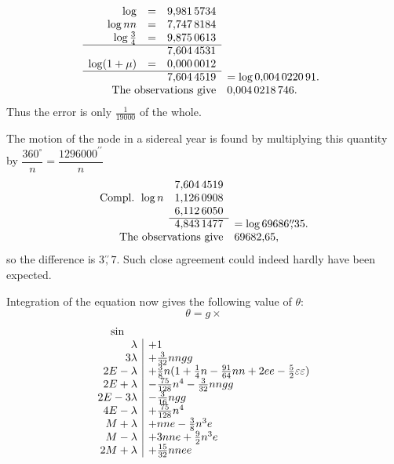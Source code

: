 \begingroup\small
\setlength{\arraycolsep}{2pt}
\renewcommand{\arraystretch}{1.15}
\[
\begin{array}{rcll}
\log&=&9{,}981\,5734&\\
\log nn&=&7{,}747\,8184&\\
\log\tfrac34&=&9{,}875\,0613&\\
\cline{1-3}
&&7{,}604\,4531&\\
\log(1+\mu)&=&0{,}000\,0012&\\
\cline{1-3}
&&7{,}604\,4519&=\log0{,}004\,0220\,91.\\
\multicolumn{3}{r}{\text{The observations give}}&0{,}004\,0218\,746.
\end{array}
\]
\endgroup
\noindent Thus the error is only \(\tfrac1{19000}\) of the whole.
\par\noindent\hspace*{\parindent}The motion of the node in a sidereal year is found by
multiplying this quantity by \(\dfrac{360^\circ}{n}=\dfrac{1296000^{\prime\prime}}{n}\)
\begingroup\small
\setlength{\arraycolsep}{2pt}
\renewcommand{\arraystretch}{1.15}
\[
\begin{array}{rll}
&7{,}604\,4519&\\
\text{Compl. }\log n&1{,}126\,0908&\\
&6{,}112\,6050&\\
\cline{2-2}
&4{,}843\,1477&=\log69686\overset{\prime\prime}{,}35.\\
\multicolumn{2}{r}{\text{The observations give}}&69682{,}65,
\end{array}
\]
\endgroup
\noindent so the difference is \(3\overset{\prime\prime}{,}7\). Such close agreement could indeed
hardly have been expected.
\par\noindent\hspace*{\parindent}Integration of the equation now gives the following value of \(\theta\):
\[
\theta=g\times
\]
\begingroup\small
\setlength{\arraycolsep}{4pt}
\renewcommand{\arraystretch}{1.3}
\[
\begin{array}{r|l}
\multicolumn{1}{c}{\sin}&\\
\lambda&+1\\
3\lambda&+\tfrac3{32}nngg\\
2E-\lambda&+\tfrac38n(1+\tfrac14n-\tfrac{91}{64}nn+2ee-\tfrac52\varepsilon\varepsilon)\\
2E+\lambda&-\tfrac{75}{128}n^4-\tfrac3{32}nngg\\
2E-3\lambda&-\tfrac3{16}ngg\\
4E-\lambda&+\tfrac{75}{128}n^4\\
M+\lambda&+nne-\tfrac38n^3e\\
M-\lambda&+3nne+\tfrac92n^3e\\
2M+\lambda&+\tfrac{15}{32}nnee
\end{array}
\]
